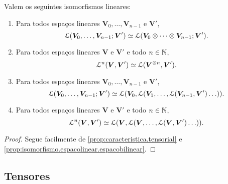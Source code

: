 \begin{proposition}
\label{prop:isomorfismos.multilineares.tensoriais}
Valem os seguintes isomorfismos lineares:
\begin{enumerate}
	\item Para todos espaços lineares $\bm V_0,\ldots,\bm V_{n-1}$ e $\bm V'$,
		\begin{equation*}
		\mathcal{L}(\bm V_0,\ldots,\bm V_{n-1}; \bm V') \simeq \mathcal{L}(\bm V_0 \otimes \cdots \otimes \bm V_{n-1}; \bm V').
		\end{equation*}
	\item Para todos espaços lineares $\bm V$ e $\bm V'$ e todo $n \in \mathbb{N}$,
		\begin{equation*}
		\mathcal{L}^n(\bm V, \bm V') \simeq \mathcal{L}(\bm V^{\otimes n}, \bm V').
		\end{equation*}
	\item Para todos espaços lineares $\bm V_0,\ldots,\bm V_{n-1}$ e $\bm V'$,
		\begin{equation*}
		\mathcal{L}(\bm V_0,\ldots,\bm V_{n-1}; \bm V') \simeq \mathcal{L}(\bm V_0, \mathcal{L}(\bm V_1, \ldots, \mathcal{L}(\bm V_{n-1}, \bm V')\ldots)).
		\end{equation*}
	\item Para todos espaços lineares $\bm V$ e $\bm V'$ e todo $n \in \mathbb{N}$,
		\begin{equation*}
		\mathcal{L}^n(\bm V, \bm V') \simeq \mathcal{L}(\bm V, \mathcal{L}(\bm V,\ldots, \mathcal{L}(\bm V, \bm V')\ldots)).
		\end{equation*}
\end{enumerate}
\end{proposition}
\begin{proof}
Segue facilmente de \ref{prop:caracteristica.tensorial} e \ref{prop:isomorfismo.espacolinear.espacobilinear}.
\end{proof}


\subsection{Tensores}


